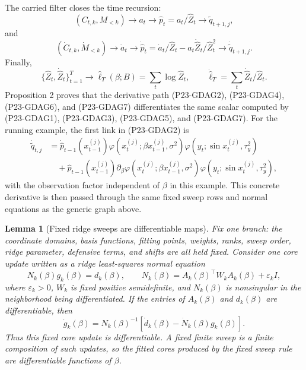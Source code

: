 \documentclass[11pt]{article}
\newtheorem{lemma}{Lemma}
\begin{document}
The carried filter closes the time recursion:
\[
    (C_{t,k},M_{<k})
    \to
    a_t
    \to
    \widehat p_t=a_t/\widehat Z_t
    \to
    \widetilde q_{t+1,j},
    \tag{P23-GDAG5}
\]
and
\[
    (\dot C_{t,k},\dot M_{<k})
    \to
    \dot a_t
    \to
    \dot{\widehat p}_t
    =
    \dot a_t/\widehat Z_t-a_t\dot{\widehat Z}_t/\widehat Z_t^2
    \to
    \dot{\widetilde q}_{t+1,j}.
    \tag{P23-GDAG6}
\]
Finally,
\[
    \{\widehat Z_t,\dot{\widehat Z}_t\}_{t=1}^T
    \to
    \widehat\ell_T(\beta;B)
    =
    \sum_t\log\widehat Z_t,
    \qquad
    \dot{\widehat\ell}_T
    =
    \sum_t\dot{\widehat Z}_t/\widehat Z_t.
    \tag{P23-GDAG7}
\]
Proposition 2 proves that the derivative path (P23-GDAG2),
(P23-GDAG4), (P23-GDAG6), and (P23-GDAG7) differentiates the same scalar
computed by (P23-GDAG1), (P23-GDAG3), (P23-GDAG5), and (P23-GDAG7).
For the running example, the first link in (P23-GDAG2) is
\[
\begin{aligned}
    \dot{\widetilde q}_{t,j}
    &=
    \dot{\widehat p}_{t-1}(x_{t-1}^{(j)})
    \varphi(x_t^{(j)};\beta x_{t-1}^{(j)},\sigma^2)
    \varphi(y_t;\sin x_t^{(j)},\tau_y^2)\\
    &\quad+
    \widehat p_{t-1}(x_{t-1}^{(j)})
    \partial_\beta
    \varphi(x_t^{(j)};\beta x_{t-1}^{(j)},\sigma^2)
    \varphi(y_t;\sin x_t^{(j)},\tau_y^2),
\end{aligned}
    \tag{P23-GDAG8}
\]
with the observation factor independent of \(\beta\) in this example.  This
concrete derivative is then passed through the same fixed sweep rows and
normal equations as the generic graph above.

\begin{lemma}[Fixed ridge sweeps are differentiable maps]
Fix one branch: the coordinate domains, basis functions, fitting points,
weights, ranks, sweep order, ridge parameter, defensive terms, and shifts are
all held fixed.  Consider one core update written as a ridge least-squares
normal equation
\[
    N_k(\beta)g_k(\beta)=d_k(\beta),
    \qquad
    N_k(\beta)=A_k(\beta)^\top W_k A_k(\beta)+\varepsilon_k I,
\]
where \(\varepsilon_k>0\), \(W_k\) is fixed positive semidefinite, and
\(N_k(\beta)\) is nonsingular in the neighborhood being differentiated.  If the
entries of \(A_k(\beta)\) and \(d_k(\beta)\) are differentiable, then
\[
    \dot g_k(\beta)
    =
    N_k(\beta)^{-1}
    \left[
    \dot d_k(\beta)-\dot N_k(\beta)g_k(\beta)
    \right].
\]
Thus this fixed core update is differentiable.  A fixed finite sweep is a
finite composition of such updates, so the fitted cores produced by the fixed
sweep rule are differentiable functions of \(\beta\).
\end{lemma}
\end{document}
